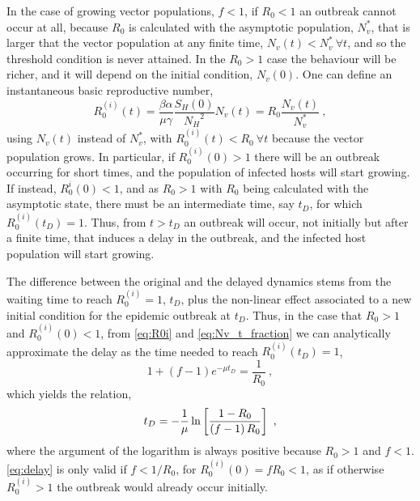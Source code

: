 In the case of growing vector populations, $f<1$, if $R_0<1$ an outbreak
cannot occur at all, because $R_0$ is calculated with the asymptotic
population, $N_v^*$, that is larger that the vector population at any finite
time, $N_v(t)<N_v^* \ \forall t$, and so the threshold condition is never
attained. In the $R_0>1$ case the behaviour will be richer, and it will depend
on the initial condition, $N_v(0)$. One can define an instantaneous basic
reproductive number,
\begin{equation}\label{eq:R0i}
    R_0^{(i)}(t)=\frac{\beta\alpha}{\mu\gamma}\frac{S_H(0)}{{N_H}^2}
    N_v(t)=R_0\frac{N_v(t)}{N_v^*} \ ,
\end{equation}
using $N_v(t)$ instead of $N_v^*$, with $R_0^{(i)}(t)<R_0 \ \forall t$
because the vector population grows. In particular, if $R_0^{(i)}(0)>1$ there
will be an outbreak occurring for short times, and the population of infected
hosts will start growing. If instead, $R_0^i(0)<1$, and as $R_0>1$ with $R_0$
being calculated with the asymptotic state, there must be an intermediate time,
say $t_D$, for which $R_0^{(i)}(t_D)=1$. Thus, from $t>t_D$ an outbreak will
occur, not initially but after a finite time, that induces a delay in the
outbreak, and the infected host population will start growing.

The difference between the original and the delayed dynamics stems from the
waiting time to reach $R_0^{(i)}=1$, $t_D$, plus the non-linear effect
associated to a new initial condition for the epidemic outbreak at $t_D$. Thus,
in the case that $R_0>1$ and $R_0^{(i)}(0)<1$, from \cref{eq:R0i} and
\cref{eq:Nv_t_fraction} we can analytically approximate the delay as the time
needed to reach $R_0^{(i)}(t_D)=1$,
\begin{equation}
    {1+(f-1)e^{-\mu t_D}}=\frac{1}{R_0} \ ,
\end{equation}
which yields the relation,
\begin{equation}\label{eq:delay}
    t_D=-\frac{1}{\mu}\ln\claudator{\frac{1-R_0}{\parentesi{f-1}R_0}}\ ,
\end{equation}
where the argument of the logarithm is always positive because $R_0>1$ and
$f<1$. \cref{eq:delay} is only valid if $f<1/R_0$, for $R_0^{(i)}(0)=f R_0<1$,
as if otherwise $R_0^{(i)}>1$ the outbreak would already occur initially.

